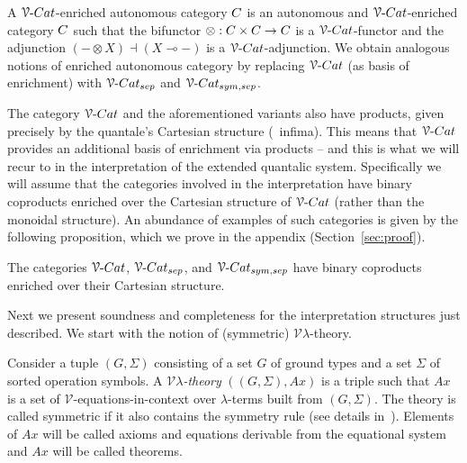 \documentclass[a4paper,UKenglish,cleveref, autoref, thm-restate]{lipics-v2021}
\begin{document}
\begin{definition}\label{defn:enr_aut}
  A $\VCat$-enriched autonomous category $\catC$ is an autonomous and
  $\VCat$-enriched category $\catC$ such that the bifunctor $\otimes : \catC
  \times \catC \to \catC$ is a $\VCat$-functor and the adjunction $(- \otimes
  X) \dashv (X \multimap -)$ is a $\VCat$-adjunction.  We obtain analogous
  notions of enriched autonomous category by replacing $\VCat$ (as basis of
  enrichment) with $\VCatSe$ and $\VCatSS$.
\end{definition}
The category $\VCat$ and the aforementioned variants also have products, given
precisely by the quantale's Cartesian structure (\ie\ infima).  This means that
$\VCat$ provides an additional basis of enrichment via products -- and this is
what we will recur to in the interpretation of the extended quantalic system.
Specifically we will assume that the categories involved in the interpretation
have binary coproducts enriched over the Cartesian structure of $\VCat$ (rather
than the monoidal structure). An abundance of examples of such categories is
given by the following proposition, which we prove in the appendix
(Section~\ref{sec:proof}).

\begin{proposition}
        \label{prop:vcat}
        The categories $\VCat$, $\VCatSe$, and $\VCatSS$   have binary
        coproducts enriched over their Cartesian structure.
\end{proposition}
Next we present soundness and completeness for the interpretation structures
just described. We start with the notion of (symmetric)
$\mathcal{V}\lambda$-theory.

\begin{definition}\label{defn:theory}
  Consider a tuple $(G,\Sigma)$ consisting of a set $G$ of ground types and a
  set $\Sigma$ of sorted operation symbols.  A \emph{$\mathcal{V}
  \lambda$-theory} $((G,\Sigma),Ax)$ is a triple such that $Ax$ is a set of
  $\mathcal{V}$-equations-in-context over $\lambda$-terms built from
  $(G,\Sigma)$. The theory is called symmetric if it also contains the symmetry
  rule (see details in~\cite{dahlqvist22,dahlqvist2023syntactic}).  Elements of
  $Ax$ will be called axioms and equations derivable from the equational system
  and $Ax$ will be called theorems.
\end{definition}
\end{document}
